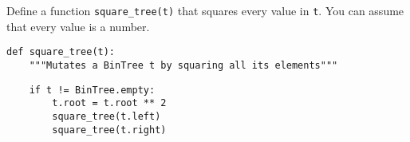 \question Define a function {\tt square\_tree(t)} that squares every value in
{\tt t}. You can assume that every value is a number.

\begin{lstlisting}
def square_tree(t):
    """Mutates a BinTree t by squaring all its elements"""
\end{lstlisting}
\begin{solution}[0.7in]
\begin{lstlisting}
    if t != BinTree.empty:
        t.root = t.root ** 2
        square_tree(t.left)
        square_tree(t.right)
\end{lstlisting}
\end{solution}
